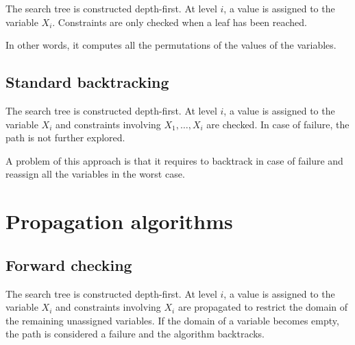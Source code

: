 The search tree is constructed depth-first. 
At level $i$, a value is assigned to the variable $X_i$.
Constraints are only checked when a leaf has been reached.

In other words, it computes all the permutations of the values of the variables.


\subsection{Standard backtracking}

The search tree is constructed depth-first. 
At level $i$, a value is assigned to the variable $X_i$ and 
constraints involving $X_1, \dots, X_i$ are checked.
In case of failure, the path is not further explored.

A problem of this approach is that it requires to backtrack in case of failure
and reassign all the variables in the worst case.



\section{Propagation algorithms}

\subsection{Forward checking}

The search tree is constructed depth-first. 
At level $i$, a value is assigned to the variable $X_i$ and 
constraints involving $X_i$ are propagated
to restrict the domain of the remaining unassigned variables.
If the domain of a variable becomes empty, the path is considered a failure and the algorithm backtracks.